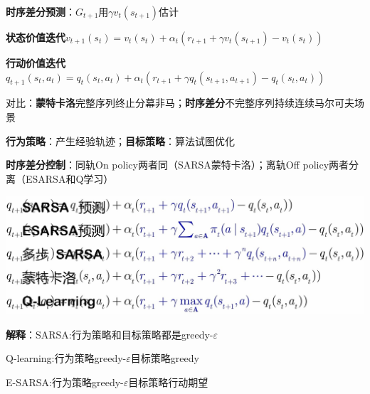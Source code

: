	\textbf{时序差分预测}：$G_{t+1}$用$\gamma v_t(s_{t+1})$估计
	
	\textbf{状态价值迭代}$v_{t+1}(s_{t})=v_{t}(s_{t})+\alpha_{t}(r_{t+1}+\gamma v_{t}(s_{t+1})-v_{t}(s_{t}))$
	
	\textbf{行动价值迭代}$q_{t+1}(s_t, a_t) = q_t(s_t, a_t) + \alpha_t(r_{t+1} + \gamma q_t(s_{t+1}, a_{t+1}) - q_t(s_t, a_t))$
	
	对比：\textbf{蒙特卡洛}完整序列终止分幕非马；\textbf{时序差分}不完整序列持续连续马尔可夫场景
	
	\textbf{行为策略}：产生经验轨迹；\textbf{目标策略}：算法试图优化
	
	\textbf{时序差分控制}：同轨On policy两者同（SARSA蒙特卡洛）；离轨Off policy两者分离（ESARSA和Q学习）
	
	\begin{figurehere}
		\centering
		\includegraphics[width=1\linewidth]{image12}
		\label{fig:image12}
	\end{figurehere}
	\textbf{解释}：SARSA:行为策略和目标策略都是greedy-$\varepsilon$
	
	Q-learning:行为策略greedy-$\varepsilon$目标策略greedy
	
	E-SARSA:行为策略greedy-$\varepsilon$目标策略行动期望
	
